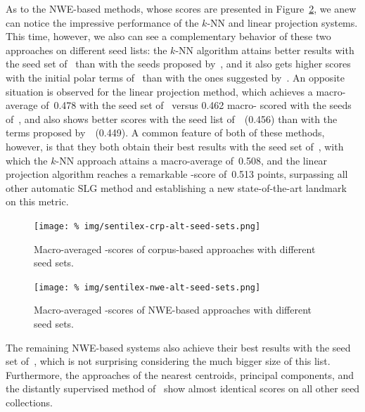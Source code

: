 As to the NWE-based methods, whose scores are presented in
Figure~\ref{snt:fig:sent-nwe-lex-alt-seeds}, we anew can notice the
impressive performance of the $k$-NN and linear projection systems.
This time, however, we also can see a complementary behavior of these
two approaches on different seed lists: the $k$-NN algorithm attains
better results with the seed set of~\citet{Turney:03} than with the
seeds proposed by~\citet{Hu:04}, and it also gets higher scores with
the initial polar terms of~\citet{Remus:10} than with the ones
suggested by~\citet{Esuli:05}.  An opposite situation is observed for
the linear projection method, which achieves a macro-average of~0.478
with the seed set of~\citet{Hu:04} versus 0.462 macro-\F{} scored with
the seeds of~\citet{Turney:03}, and also shows better scores with the
seed list of~\citet{Esuli:05}~(0.456) than with the terms proposed
by~\citet{Remus:10}~(0.449).  A common feature of both of these
methods, however, is that they both obtain their best results with the
seed set of~\citet{Kim:04}, with which the $k$-NN approach attains a
macro-average of~0.508, and the linear projection algorithm reaches a
remarkable \F-score of~0.513 points, surpassing all other automatic
SLG method and establishing a new state-of-the-art landmark on this
metric.

\begin{figure}[hbtp]
  \centering
  \texttt{[image: \%
    img/sentilex-crp-alt-seed-sets.png]}
  \caption{Macro-averaged \F{}-scores of corpus-based approaches with
    different seed sets.}\label{snt:fig:sent-crp-lex-alt-seeds}
\end{figure}


\begin{figure}[hbtp]
  \centering
  \texttt{[image: \%
    img/sentilex-nwe-alt-seed-sets.png]}
  \caption{Macro-averaged \F{}-scores of NWE-based approaches with
    different seed sets.}\label{snt:fig:sent-nwe-lex-alt-seeds}
\end{figure}

The remaining NWE-based systems also achieve their best results with
the seed set of~\citet{Kim:04}, which is not surprising considering
the much bigger size of this list.  Furthermore, the approaches of the
nearest centroids, principal components, and the distantly supervised
method of~\citet{Vo:16} show almost identical scores on all other seed
collections.

